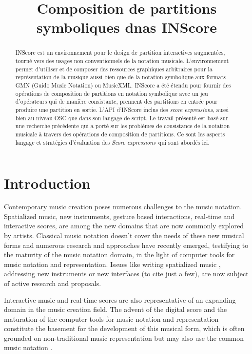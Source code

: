 \documentclass{article}
\title{Composition de partitions symboliques dnas INScore}
\newcommand{\sExpr}{\emph{score expressions}}
\newcommand{\SExpr}{\emph{Score expressions}}
\begin{document}
%
\maketitle
%
\begin{abstract}
INScore est un environnement pour le design de partition interactives augmentées, tourné vers des usages non conventionnels de la notation musicale. L'environnement permet d'utiliser et de composer des ressources graphiques arbitraires pour la représentation de la musique aussi bien que de la notation symbolique aux formats GMN (Guido Music Notation) ou MusicXML. INScore a été étendu pour fournir des opérations de composition de partitions en notation symbolique avec un jeu d'opérateurs qui de manière consistante, prennent des partitions en entrée pour produire une partition en sortie. L'API d'INScore inclus des \sExpr , aussi bien au niveau OSC que dans son langage de script. 
Le travail présenté est basé sur une recherche précédente qui a porté sur les problèmes de consistance de la notation musicale à travers des opérations de composition de partitions. Ce sont les aspects langage et stratégies d'évaluation des \SExpr\ qui sont abordés ici.
\end{abstract}

\section{Introduction}\label{sec:introduction}

Contemporary music creation poses numerous challenges to the music notation. Spatialized music, new instruments, gesture based interactions, real-time and interactive scores, are among the new domains that are now commonly explored by artists. 
Classical music notation doesn't cover the needs of these new musical forms and numerous research and approaches have recently emerged, testifying to the maturity of the music notation domain, in the light of computer tools for music notation and representation.
Issues like writing spatialized music \cite{Ellberger_tenor2015}, addressing new instruments \cite{tmays:2014} or new interfaces \cite{kschlei:2015} (to cite just a few), are now subject of active research and proposals.

Interactive music and real-time scores are also representative of an expanding domain in the music creation field. The advent of the digital score and the maturation of the computer tools for music notation and representation constitute the basement for the development of this musical form, which is often grounded on non-traditional music representation \cite{RSmith_tenor2015} \cite{Hope_tenor2015} but may also use the common music notation \cite{Hoadley12,hoadley14}. 
\end{document}
